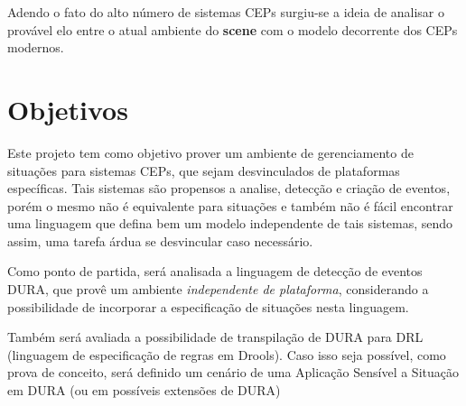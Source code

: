 \documentclass[
	12pt,				%
	openright,			%
	twoside,			%
	a4paper,			%
	english,			%
	french,				%
	spanish,			%
	brazil,				%
	]{abntex2}
\begin{document}
Adendo o fato do alto número de sistemas CEPs surgiu-se a ideia de analisar o provável elo entre o atual ambiente do \textbf{scene} com o modelo decorrente dos CEPs modernos.
% 
% 

\chapter{Objetivos} %

Este projeto tem como objetivo prover um ambiente de gerenciamento de situações para sistemas CEPs, que sejam desvinculados de plataformas específicas. Tais sistemas são propensos a analise, detecção e criação de eventos, porém o mesmo não é equivalente para situações e também não é fácil encontrar uma linguagem que defina bem um modelo independente de tais sistemas, sendo assim, uma tarefa árdua se desvincular caso necessário.
% 
% 


Como ponto de partida, será analisada a linguagem de detecção de eventos DURA, que provê um ambiente  \textit{independente de plataforma}, considerando a possibilidade de incorporar a especificação de situações nesta linguagem.

Também será avaliada a possibilidade de transpilação de DURA para DRL (linguagem de especificação de regras em Drools). Caso isso seja possível, como prova de conceito, será definido um cenário de uma Aplicação Sensível a Situação em DURA (ou em possíveis extensões de DURA)
%
%

%
%
% 
% 




\printindex
\end{document}
